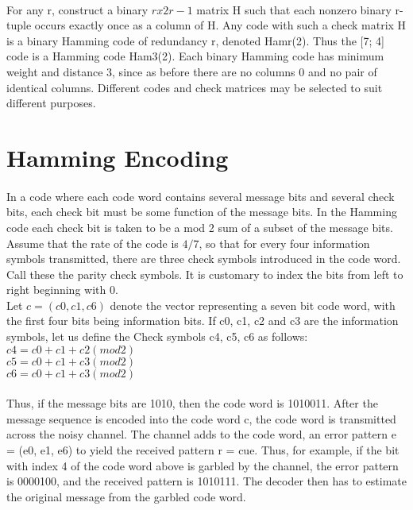 \documentclass[14pt]{report}
\begin{document}
{\paragraph{} For any r, construct a binary $rx2r-1$ matrix H such that each nonzero binary r-tuple occurs exactly once as a column of H. Any code with such a check matrix H is a binary Hamming code of redundancy r, denoted Hamr(2). Thus the [7; 4] code is a Hamming code Ham3(2). Each binary Hamming code has minimum weight and distance 3, since as before there are no columns 0 and no pair of identical columns. Different  codes and check matrices may be selected to suit different purposes.
\section{Hamming Encoding}
\paragraph{} In a code where each code word contains several message bits and several check bits, each check bit must be some function of the message bits. In the Hamming code each check bit is taken to be a mod 2 sum of a subset of the message bits. Assume that the rate of the code is $4/7$, so that for every four information symbols transmitted, there are three check symbols introduced in the code word. Call these the parity check symbols. It is customary to index the bits from left to right beginning with 0.\\
Let $c = (c0, c1, c6)$ denote the vector representing a seven bit code word, with the first four bits being information bits. If c0, c1, c2 and c3 are the information symbols, let us define the Check symbols c4, c5, c6 as follows:\\
$c4 = c0 + c1 + c2 (mod 2)$\\
$c5 = c0 + c1 + c3 (mod 2)$\\
$c6 = c0 + c1 + c3 (mod 2)$
\paragraph{} Thus, if the message bits are 1010, then the code word is 1010011. After the message sequence is encoded into the code word c, the code word is transmitted across the noisy channel. The channel adds to the code word, an error pattern e = (e0, e1, e6) to yield the received pattern r = cue. Thus, for example, if the bit with index 4 of the code word above is garbled by the channel, the error pattern is 0000100, and the received pattern is 1010111. The decoder then has to estimate the original message from the garbled code word.
}
\end{document}
